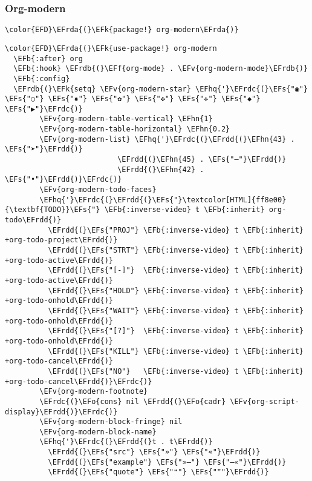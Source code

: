 \documentclass[12pt]{article}
\theoremstyle{plain}%
\theoremstyle{definition}
\theoremstyle{remark}
\newcommand{\EFs}[1]{\textcolor{EFs}{#1}} %
\newcommand{\EFk}[1]{\textcolor{EFk}{#1}} %
\newcommand{\EFb}[1]{\textcolor{EFb}{#1}} %
\newcommand{\EFf}[1]{\textcolor{EFf}{#1}} %
\newcommand{\EFv}[1]{\textcolor{EFv}{#1}} %
\newcommand{\EFo}[1]{\textcolor{EFo}{#1}} %
\newcommand{\EFhn}[1]{\textcolor{EFhn}{\textbf{#1}}} %
\newcommand{\EFhq}[1]{\textcolor{EFhq}{#1}} %
\newcommand{\EFrda}[1]{\textcolor{EFrda}{#1}} %
\newcommand{\EFrdb}[1]{\textcolor{EFrdb}{#1}} %
\newcommand{\EFrdc}[1]{\textcolor{EFrdc}{#1}} %
\newcommand{\EFrdd}[1]{\textcolor{EFrdd}{#1}} %
\begin{document}
\subsubsection{Org-modern}
\label{sec:org10ac9e4}
\begin{Code}
\begin{Verbatim}
\color{EFD}\EFrda{(}\EFk{package!} org-modern\EFrda{)}
\end{Verbatim}
\end{Code}
\begin{Code}
\begin{Verbatim}
\color{EFD}\EFrda{(}\EFk{use-package!} org-modern
  \EFb{:after} org
  \EFb{:hook} \EFrdb{(}\EFf{org-mode} . \EFv{org-modern-mode}\EFrdb{)}
  \EFb{:config}
  \EFrdb{(}\EFk{setq} \EFv{org-modern-star} \EFhq{'}\EFrdc{(}\EFs{"◉"} \EFs{"○"} \EFs{"✸"} \EFs{"✿"} \EFs{"✤"} \EFs{"✜"} \EFs{"◆"} \EFs{"▶"}\EFrdc{)}
        \EFv{org-modern-table-vertical} \EFhn{1}
        \EFv{org-modern-table-horizontal} \EFhn{0.2}
        \EFv{org-modern-list} \EFhq{'}\EFrdc{(}\EFrdd{(}\EFhn{43} . \EFs{"➤"}\EFrdd{)}
                          \EFrdd{(}\EFhn{45} . \EFs{"–"}\EFrdd{)}
                          \EFrdd{(}\EFhn{42} . \EFs{"•"}\EFrdd{)}\EFrdc{)}
        \EFv{org-modern-todo-faces}
        \EFhq{'}\EFrdc{(}\EFrdd{(}\EFs{"}\textcolor[HTML]{ff8e00}{\textbf{TODO}}\EFs{"} \EFb{:inverse-video} t \EFb{:inherit} org-todo\EFrdd{)}
          \EFrdd{(}\EFs{"PROJ"} \EFb{:inverse-video} t \EFb{:inherit} +org-todo-project\EFrdd{)}
          \EFrdd{(}\EFs{"STRT"} \EFb{:inverse-video} t \EFb{:inherit} +org-todo-active\EFrdd{)}
          \EFrdd{(}\EFs{"[-]"}  \EFb{:inverse-video} t \EFb{:inherit} +org-todo-active\EFrdd{)}
          \EFrdd{(}\EFs{"HOLD"} \EFb{:inverse-video} t \EFb{:inherit} +org-todo-onhold\EFrdd{)}
          \EFrdd{(}\EFs{"WAIT"} \EFb{:inverse-video} t \EFb{:inherit} +org-todo-onhold\EFrdd{)}
          \EFrdd{(}\EFs{"[?]"}  \EFb{:inverse-video} t \EFb{:inherit} +org-todo-onhold\EFrdd{)}
          \EFrdd{(}\EFs{"KILL"} \EFb{:inverse-video} t \EFb{:inherit} +org-todo-cancel\EFrdd{)}
          \EFrdd{(}\EFs{"NO"}   \EFb{:inverse-video} t \EFb{:inherit} +org-todo-cancel\EFrdd{)}\EFrdc{)}
        \EFv{org-modern-footnote}
        \EFrdc{(}\EFo{cons} nil \EFrdd{(}\EFo{cadr} \EFv{org-script-display}\EFrdd{)}\EFrdc{)}
        \EFv{org-modern-block-fringe} nil
        \EFv{org-modern-block-name}
        \EFhq{'}\EFrdc{(}\EFrdd{(}t . t\EFrdd{)}
          \EFrdd{(}\EFs{"src"} \EFs{"»"} \EFs{"«"}\EFrdd{)}
          \EFrdd{(}\EFs{"example"} \EFs{"»–"} \EFs{"–«"}\EFrdd{)}
          \EFrdd{(}\EFs{"quote"} \EFs{"❝"} \EFs{"❞"}\EFrdd{)}

\end{Verbatim}
\end{Code}
\end{document}
